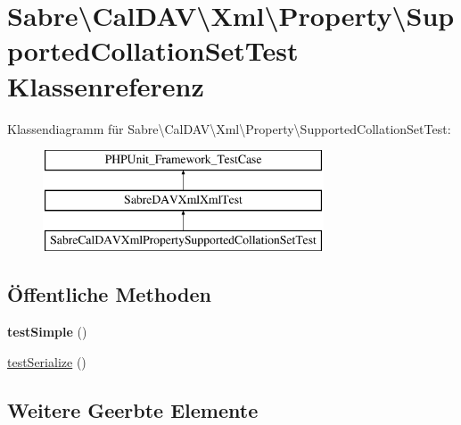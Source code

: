 \hypertarget{class_sabre_1_1_cal_d_a_v_1_1_xml_1_1_property_1_1_supported_collation_set_test}{}\section{Sabre\textbackslash{}Cal\+D\+AV\textbackslash{}Xml\textbackslash{}Property\textbackslash{}Supported\+Collation\+Set\+Test Klassenreferenz}
\label{class_sabre_1_1_cal_d_a_v_1_1_xml_1_1_property_1_1_supported_collation_set_test}
Klassendiagramm für Sabre\textbackslash{}Cal\+D\+AV\textbackslash{}Xml\textbackslash{}Property\textbackslash{}Supported\+Collation\+Set\+Test\+:\begin{figure}[H]
\begin{center}
\leavevmode
\includegraphics[height=3.000000cm]{class_sabre_1_1_cal_d_a_v_1_1_xml_1_1_property_1_1_supported_collation_set_test}
\end{center}
\end{figure}
\subsection*{Öffentliche Methoden}
\begin{DoxyCompactItemize}
\item 
\mbox{\label{class_sabre_1_1_cal_d_a_v_1_1_xml_1_1_property_1_1_supported_collation_set_test_a0ef6878b57621babcb1b79ec26203971}} 
{\bfseries test\+Simple} ()
\item 
\mbox{\hyperlink{class_sabre_1_1_cal_d_a_v_1_1_xml_1_1_property_1_1_supported_collation_set_test_a25e64f59300cf6818576a67ec7dedf53}{test\+Serialize}} ()
\end{DoxyCompactItemize}
\subsection*{Weitere Geerbte Elemente}


